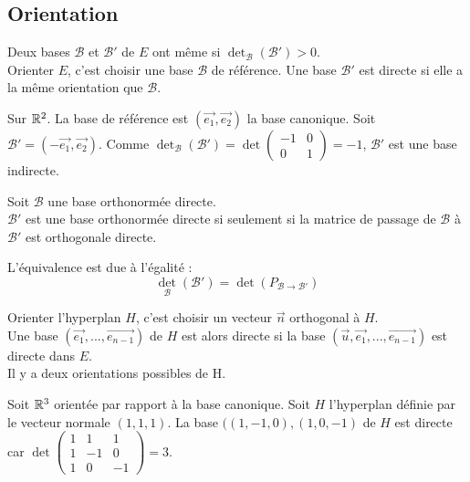 \documentclass{book}
\begin{document}
\subsection{Orientation}
\begin{Definition}[Orientation]
Deux bases $\mathcal{B}$ et $\mathcal{B}'$ de $E$ ont même  si $\det_\mathcal{B}(\mathcal{B}') > 0.$\\
Orienter $E$, c'est choisir une base $\mathcal{B}$ de référence. Une base $\mathcal{B}'$ est directe si elle a la même
orientation que $\mathcal{B}$.
\end{Definition}
\begin{Exemple}
Sur $\mathbb{R}^2$. La base de référence est $(\vec{e_1},\vec{e_2})$ la base canonique. Soit  $\mathcal{B}'=(-\vec{e_1},\vec{e_2}).$ Comme $\det_\mathcal{B}(\mathcal{B}')=\det \begin{pmatrix}-1&0\\0&1
\end{pmatrix}=-1$, $\mathcal{B}'$ est une base indirecte.
\end{Exemple}
\begin{Proposition}
Soit $\mathcal{B}$ une base orthonormée directe.\\
$\mathcal{B}'$ est une base orthonormée directe si seulement si la matrice de passage de $\mathcal{B}$ à $\mathcal{B}'$ est orthogonale directe.
\end{Proposition}
\begin{Demonstration}
L'équivalence est due à l'égalité :
$$ \det_\mathcal{B}(\mathcal{B}')=\det( P_{\mathcal{B}\to\mathcal{B}'})$$
\end{Demonstration}
\begin{Definition}
Orienter l'hyperplan $H$, c'est choisir un vecteur $\vec{n}$ orthogonal à $H$.\\
Une base $(\vec{e_1},...,\vec{e_{n-1}})$
de $H$ est alors directe si la base $(\vec{u},\vec{e_1},...,\vec{e_{n-1}})$ est directe dans $E$.\\
Il y a deux orientations possibles de H.
\end{Definition}
\begin{Exemple}
Soit $\mathbb{R}^3$ orientée par rapport à la base canonique. Soit $H$ l'hyperplan définie par le vecteur normale $(1,1,1)$. La base $((1,-1,0),(1,0,-1)$ de $H$ est directe car $\det \begin{pmatrix}1&1&1\\1&-1&0
\\1&0&-1\end{pmatrix}=3$. 
\end{Exemple}
\end{document}
